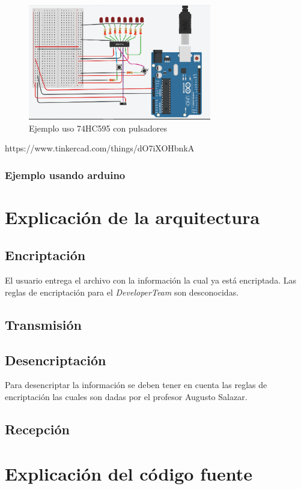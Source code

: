 \documentclass{article}
\begin{document}
\begin{figure}[H]
    \includegraphics[width=8cm ]{imagen/ej_pulsadores.png}
    \centering
    \caption{Ejemplo uso 74HC595 con pulsadores}
    \label{fig:ej_pulsadores}
    \end{figure}

https://www.tinkercad.com/things/dO7iXOHbnkA



\subsubsection{Ejemplo usando arduino}


\section{Explicación de la arquitectura} 
\subsection{Encriptación}
El usuario entrega el archivo con la información la cual ya está encriptada. Las reglas de encriptación para el \textit{DeveloperTeam} son desconocidas.

\subsection{Transmisión}

\subsection{Desencriptación}
Para desencriptar la información se deben tener en cuenta las reglas de encriptación las cuales son dadas por el profesor Augusto Salazar.

\subsection{Recepción}


\section{Explicación del código fuente} 
 
\end{document}

